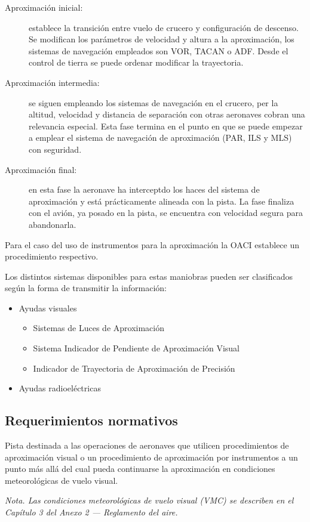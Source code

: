\begin{description}
\item [Aproximación inicial:] establece la transición entre vuelo de
  crucero y configuración de descenso. Se modifican los parámetros
  de velocidad y altura a la aproximación, los sistemas de navegación
  empleados son VOR, TACAN o ADF. Desde el control de tierra se puede
  ordenar modificar la trayectoria.
  
\item [Aproximación intermedia:] se
  siguen empleando los sistemas de navegación en el crucero, per la
  altitud, velocidad y distancia de separación con otras aeronaves
  cobran una relevancia especial. Esta fase termina en el punto en que
  se puede empezar a emplear el sistema de navegación de aproximación
  (PAR, ILS y MLS) con seguridad.
  
\item [Aproximación final:] en esta fase la
  aeronave ha interceptdo los haces del sistema de aproximación y
  está prácticamente alineada con la pista. La fase finaliza con el
  avión, ya posado en la pista, se encuentra con velocidad segura para
  abandonarla.
\end{description}

Para el caso del uso de instrumentos para la aproximación la OACI establece un procedimiento respectivo.


Los distintos sistemas disponibles para estas maniobras pueden ser clasificados según la forma de transmitir la información:

\begin{itemize}
\item Ayudas visuales
  \begin{itemize}
  \item Sistemas de Luces de Aproximación
  \item Sistema  Indicador de Pendiente de Aproximación Visual
  \item Indicador de Trayectoria de Aproximación de Precisión
  \end{itemize}
\item Ayudas radioeléctricas
\end{itemize}

\subsection{Requerimientos normativos}
\label{sec:06.requerimientos.normativos.aproximacion}


\begin{tcolorbox}[title={
Pista de vuelo visual.     
    OACI. Anexo 14. Edición 2018
  }
  ]
  {\footnotesize
    Pista destinada a las operaciones de aeronaves que utilicen procedimientos de aproximación visual
    o un procedimiento de aproximación por instrumentos a un punto más allá del cual pueda continuarse
    la aproximación en condiciones meteorológicas de vuelo visual.

\emph{Nota. Las condiciones meteorológicas de vuelo visual (VMC) se describen en el Capítulo 3 del Anexo 2 — Reglamento
del aire.
}
  }
  
\end{tcolorbox}


